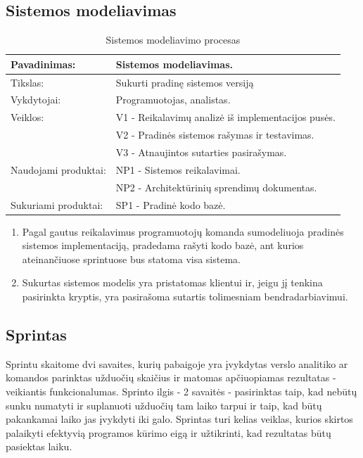 \documentclass{VUMIFPSkursinis}
\begin{document}
	\newpage

	\subsection{Sistemos modeliavimas}
	\begin{center}
		\begin{table}[ht]
			\caption{Sistemos modeliavimo procesas}
			\begin{tabular}{ | l | l | }
				\hline
				Pavadinimas:		& Sistemos modeliavimas.				\\ \hline
				Tikslas:		& Sukurti pradinę sistemos versiją			\\ \hline
				Vykdytojai:		& Programuotojas, analistas.				\\ \hline
				Veiklos:		& V1 - Reikalavimų analizė iš implementacijos pusės.	\\
							& V2 - Pradinės sistemos rašymas ir testavimas.		\\
							& V3 - Atnaujintos sutarties pasirašymas.		\\ \hline
				Naudojami produktai:	& NP1 - Sistemos reikalavimai. 				\\
							& NP2 - Architektūrinių sprendimų dokumentas.		\\ \hline
				Sukuriami produktai:	& SP1 - Pradinė kodo bazė. 				\\
			\end{tabular}
		\end{table}
	\end{center}

	\begin{enumerate}
		\item Pagal gautus reikalavimus programuotojų komanda sumodeliuoja pradinės sistemos implementaciją, pradedama rašyti kodo bazė, ant kurios ateinančiuose sprintuose bus statoma visa sistema.
		\item Sukurtas sistemos modelis yra pristatomas klientui ir, jeigu jį tenkina pasirinkta kryptis, yra pasirašoma sutartis tolimesniam bendradarbiavimui.
	\end{enumerate}

	\subsection{Sprintas}
	Sprintu skaitome dvi savaites, kurių pabaigoje yra įvykdytas verslo analitiko ar komandos parinktas užduočių skaičius ir matomas apčiuopiamas rezultatas - veikiantis funkcionalumas.
	Sprinto ilgis - 2 savaitės - pasirinktas taip, kad nebūtų sunku numatyti ir suplanuoti užduočių tam laiko tarpui ir taip, kad būtų pakankamai laiko jas įvykdyti iki galo.
	Sprintas turi kelias veiklas, kurios skirtos palaikyti efektyvią programos kūrimo eigą ir užtikrinti, kad rezultatas būtų pasiektas laiku.
\end{document}
